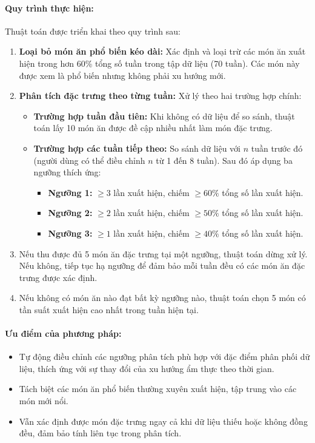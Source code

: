 \paragraph{Quy trình thực hiện:}
Thuật toán được triển khai theo quy trình sau:
\begin{enumerate}
    \item \textbf{Loại bỏ món ăn phổ biến kéo dài:} Xác định và loại trừ các món ăn xuất hiện trong hơn 60\% tổng số tuần trong tập dữ liệu (70 tuần). Các món này được xem là phổ biến nhưng không phải xu hướng mới.
    
    \item \textbf{Phân tích đặc trưng theo từng tuần:} Xử lý theo hai trường hợp chính:
    \begin{itemize}
        \item \textbf{Trường hợp tuần đầu tiên:} Khi không có dữ liệu để so sánh, thuật toán lấy 10 món ăn được đề cập nhiều nhất làm món đặc trưng.
        
        \item \textbf{Trường hợp các tuần tiếp theo:} So sánh dữ liệu với $n$ tuần trước đó (người dùng có thể điều chỉnh $n$ từ 1 đến 8 tuần). Sau đó áp dụng ba ngưỡng thích ứng:
        \begin{itemize}
            \item \textbf{Ngưỡng 1:} $\geq 3$ lần xuất hiện, chiếm $\geq 60\%$ tổng số lần xuất hiện.
            \item \textbf{Ngưỡng 2:} $\geq 2$ lần xuất hiện, chiếm $\geq 50\%$ tổng số lần xuất hiện.
            \item \textbf{Ngưỡng 3:} $\geq 1$ lần xuất hiện, chiếm $\geq 40\%$ tổng số lần xuất hiện.
        \end{itemize}
    \end{itemize}
    
    \item Nếu thu được đủ 5 món ăn đặc trưng tại một ngưỡng, thuật toán dừng xử lý. Nếu không, tiếp tục hạ ngưỡng để đảm bảo mỗi tuần đều có các món ăn đặc trưng được xác định.
    
    \item Nếu không có món ăn nào đạt bất kỳ ngưỡng nào, thuật toán chọn 5 món có tần suất xuất hiện cao nhất trong tuần hiện tại.
\end{enumerate}

\paragraph{Ưu điểm của phương pháp:}
\begin{itemize}
    \item Tự động điều chỉnh các ngưỡng phân tích phù hợp với đặc điểm phân phối dữ liệu, thích ứng với sự thay đổi của xu hướng ẩm thực theo thời gian.
    
    \item Tách biệt các món ăn phổ biến thường xuyên xuất hiện, tập trung vào các món mới nổi.
    
    \item Vẫn xác định được món đặc trưng ngay cả khi dữ liệu thiếu hoặc không đồng đều, đảm bảo tính liên tục trong phân tích.
\end{itemize}
